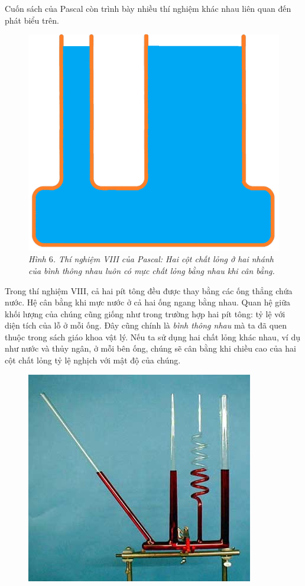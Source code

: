\begin{multicols}{2}
	\vskip 0.2cm
	Cuốn sách của Pascal còn trình bày nhiều thí nghiệm khác nhau liên quan đến phát biểu trên. 
	\begin{figure}[H]
		\vspace*{5pt}
		\centering
		\captionsetup{labelformat= empty, justification=centering}
		\includegraphics[width= 0.75\linewidth]{8}
		\caption{\small\textit{\color{timhieukhoahoc}Hình $6$. Thí nghiệm VIII của Pascal: Hai cột chất lỏng ở hai nhánh của bình thông nhau luôn có mực chất lỏng bằng nhau khi cân bằng.}}
		\vspace*{-10pt}
	\end{figure}
	Trong thí nghiệm VIII, cả hai pít tông đều được thay bằng các ống thẳng chứa nước. Hệ cân bằng khi mực nước ở cả hai ống ngang bằng nhau. Quan hệ giữa khối lượng của chúng cũng giống như trong trường hợp hai pít tông: tỷ lệ với diện tích của lỗ ở mỗi ống. Đây cũng chính là \textit{bình thông nhau} mà ta đã quen thuộc trong sách giáo khoa vật lý. Nếu ta sử dụng hai chất lỏng khác nhau, ví dụ như nước và thủy ngân, ở mỗi bên ống, chúng sẽ cân bằng khi chiều cao của hai cột chất lỏng tỷ lệ nghịch với mật độ của chúng.
	\begin{figure}[H]
		\vspace*{-5pt}
		\centering
		\captionsetup{labelformat= empty, justification=centering}
		\includegraphics[width= 0.75\linewidth]{9}

\end{figure}
\end{multicols}
